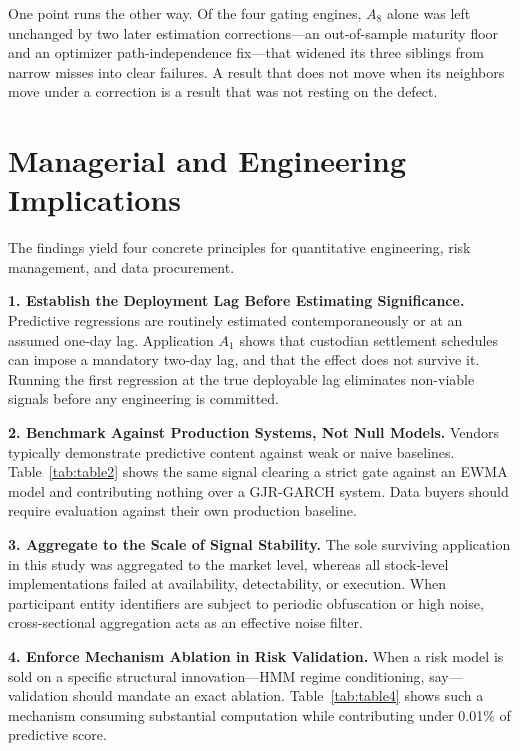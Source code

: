 \documentclass{ieeeaccess}
\begin{document}
One point runs the other way. Of the four gating engines, $A_8$ alone was left unchanged by two later estimation corrections---an out-of-sample maturity floor and an optimizer path-independence fix---that widened its three siblings from narrow misses into clear failures. A result that does not move when its neighbors move under a correction is a result that was not resting on the defect.

\section{Managerial and Engineering Implications}
\label{sec:implications}
The findings yield four concrete principles for quantitative engineering, risk management, and data procurement.

\textbf{1. Establish the Deployment Lag Before Estimating Significance.} Predictive regressions are routinely estimated contemporaneously or at an assumed one-day lag. Application $A_1$ shows that custodian settlement schedules can impose a mandatory two-day lag, and that the effect does not survive it. Running the first regression at the true deployable lag eliminates non-viable signals before any engineering is committed.

\textbf{2. Benchmark Against Production Systems, Not Null Models.} Vendors typically demonstrate predictive content against weak or naive baselines. Table~\ref{tab:table2} shows the same signal clearing a strict gate against an EWMA model and contributing nothing over a GJR-GARCH system. Data buyers should require evaluation against their own production baseline.

\textbf{3. Aggregate to the Scale of Signal Stability.} The sole surviving application in this study was aggregated to the market level, whereas all stock-level implementations failed at availability, detectability, or execution. When participant entity identifiers are subject to periodic obfuscation or high noise, cross-sectional aggregation acts as an effective noise filter.

\textbf{4. Enforce Mechanism Ablation in Risk Validation.} When a risk model is sold on a specific structural innovation---HMM regime conditioning, say---validation should mandate an exact ablation. Table~\ref{tab:table4} shows such a mechanism consuming substantial computation while contributing under 0.01\% of predictive score.
\end{document}
